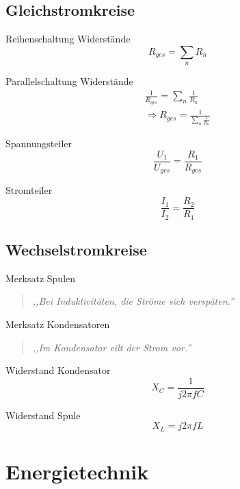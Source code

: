 \documentclass[11pt, a4paper, draft, fleqn, twocolumn]{article}
\numberwithin{equation}{subsection}
\begin{document}
\subsection{Gleichstromkreise}

Reihenschaltung Widerstände
\begin{equation}
    R_{ges} = \sum_n R_n
\end{equation}

\noindent Parallelschaltung Widerstände
\begin{equation}
\begin{split}
    \frac{1}{R_{ges}} = \sum_n \frac{1}{R_n} \\
    \Rightarrow R_{ges} = \frac{1}{\sum_n \frac{1}{R_n}}
\end{split}
\end{equation}

\noindent Spannungsteiler
\begin{equation}
    \frac{U_1}{U_{ges}} = \frac{R_1}{R_{ges}}
\end{equation}

\noindent Stromteiler
\begin{equation}
    \frac{I_1}{I_2} = \frac{R_2}{R_1}
\end{equation}

\subsection{Wechselstromkreise}

Merksatz Spulen
\begin{quote}
    \textit{,,Bei Induktivitäten, die Ströme sich verspäten.''}
\end{quote}

\noindent Merksatz Kondensatoren
\begin{quote}
    \textit{,,Im Kondensator eilt der Strom vor.''}
\end{quote}

\noindent Widerstand Kondensator
\begin{equation}
    X_C = \frac{1}{j 2\pi f C}
\end{equation}

\noindent Widerstand Spule
\begin{equation}
    X_L = j 2\pi f L
\end{equation}



\section{Energietechnik}
\end{document}
